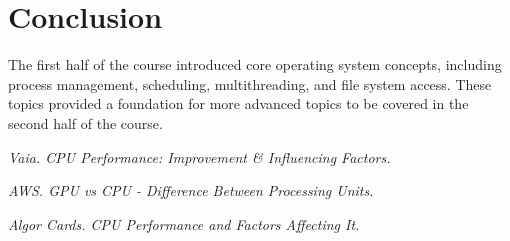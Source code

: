 \documentclass[12pt]{article}
\begin{document}
\section{Conclusion}
The first half of the course introduced core operating system concepts, including process management, scheduling, multithreading, and file system access. These topics provided a foundation for more advanced topics to be covered in the second half of the course.

\begin{thebibliography}{3}
    \textit{Vaia. CPU Performance: Improvement & Influencing Factors.}

    \textit{AWS. GPU vs CPU - Difference Between Processing Units.}
    
    \textit{Algor Cards. CPU Performance and Factors Affecting It.}
\end{thebibliography}
\end{document}
